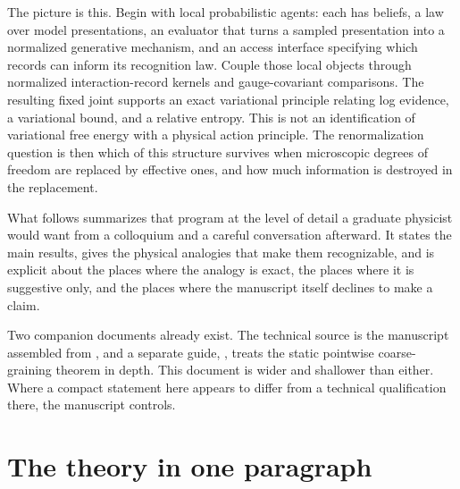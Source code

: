 \documentclass[11pt,letterpaper]{article}
\begin{document}
The picture is this. Begin with local probabilistic agents: each has beliefs, a law over model presentations, an evaluator that turns a sampled presentation into a normalized generative mechanism, and an access interface specifying which records can inform its recognition law. Couple those local objects through normalized interaction-record kernels and gauge-covariant comparisons. The resulting fixed joint supports an exact variational principle relating log evidence, a variational bound, and a relative entropy. This is not an identification of variational free energy with a physical action principle. The renormalization question is then which of this structure survives when microscopic degrees of freedom are replaced by effective ones, and how much information is destroyed in the replacement.

What follows summarizes that program at the level of detail a graduate physicist would want from a colloquium and a careful conversation afterward. It states the main results, gives the physical analogies that make them recognizable, and is explicit about the places where the analogy is exact, the places where it is suggestive only, and the places where the manuscript itself declines to make a claim.

Two companion documents already exist. The technical source is the manuscript assembled from , and a separate guide, , treats the static pointwise coarse-graining theorem in depth. This document is wider and shallower than either. Where a compact statement here appears to differ from a technical qualification there, the manuscript controls.

\section{The theory in one paragraph}
\end{document}
